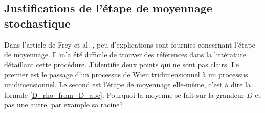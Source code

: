 \documentclass[openany,a4paper,12pt]{article}
\begin{document}
\subsection*{Justifications de l'étape de moyennage stochastique}

\par Dans l'article de Frey et al. \cite{frey2012}, peu d'explications sont fournies concernant l'étape de moyennage. Il m'a été difficile de trouver des références dans la littérature détaillant cette procédure. J'identifie deux points qui ne sont pas clairs. Le premier est le passage d'un processus de Wien tridimensionnel à un processus unidimensionnel. Le second est l'étape de moyennage elle-même, c'est à dire la formule \ref{D_rho_from_D_abc}. Pourquoi la moyenne se fait sur la grandeur $D$ et pas une autre, par example sa racine?
\end{document}
